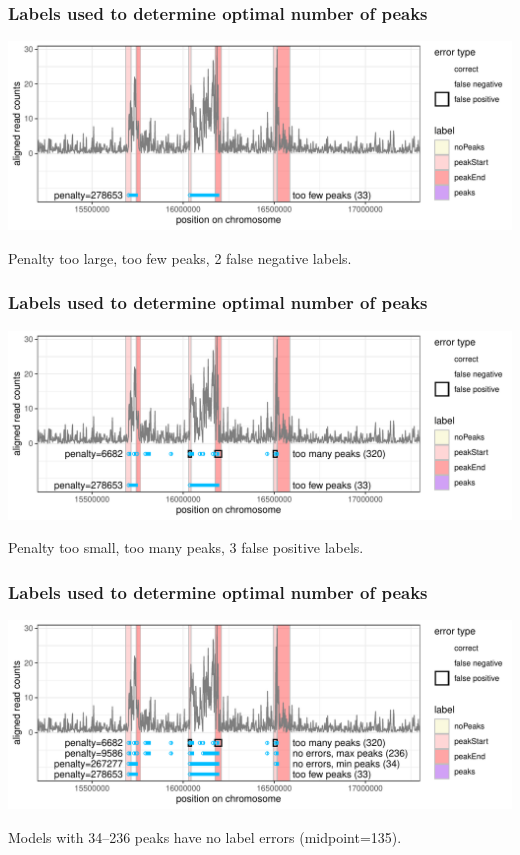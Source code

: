 \documentclass[t]{beamer}
\begin{document}
\begin{frame}
  \frametitle{Labels used to determine optimal number of peaks}
  \includegraphics[width=\textwidth]{jss-figure-label-error-too-few}

  Penalty too large, too few peaks, 2 false negative labels.
\end{frame}

\begin{frame}
  \frametitle{Labels used to determine optimal number of peaks}
  \includegraphics[width=\textwidth]{jss-figure-label-error-too-many}

  Penalty too small, too many peaks, 3 false positive labels.
\end{frame}

\begin{frame}
  \frametitle{Labels used to determine optimal number of peaks}
  \includegraphics[width=\textwidth]{jss-figure-label-error}
   
  Models with 34--236 peaks have no label errors (midpoint=135).
\end{frame}  
\end{document}
